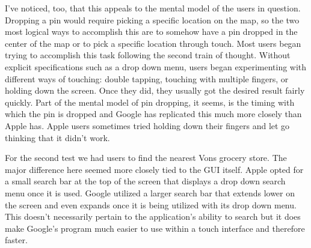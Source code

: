 \documentclass[12pt, oneside]{article}
\begin{document}
I've noticed, too, that this appeals to the mental model of the users in question. Dropping a pin would require picking a specific location on the map, so the two most logical ways to accomplish this are to somehow have a pin dropped in the center of the map or to pick a specific location through touch. Most users began trying to accomplish this task following the second train of thought. Without explicit specifications such as a drop down menu, users began experimenting with different ways of touching: double tapping, touching with multiple fingers, or holding down the screen. Once they did, they usually got the desired result fairly quickly. Part of the mental model of pin dropping, it seems, is the timing with which the pin is dropped and Google has replicated this much more closely than Apple has. Apple users sometimes tried holding down their fingers and let go thinking that it didn't work.

For the second test we had users to find the nearest Vons grocery store. The major difference here seemed more closely tied to the GUI itself. Apple opted for a small search bar at the top of the screen that displays a drop down search menu once it is used. Google utilized a larger search bar that extends lower on the screen and even expands once it is being utilized with its drop down menu. This doesn’t necessarily pertain to the application's ability to search but it does make Google's program much easier to use within a touch interface and therefore faster.
\end{document}

